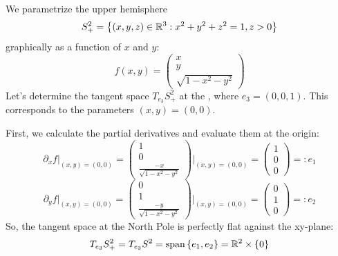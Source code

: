\begin{example*}
We parametrize the upper hemisphere
\[ S_+^2 = \left\{ (x,y,z) \in \mathbb{R}^3 : x^2 + y^2 + z^2 = 1, z > 0 \right\} \]
graphically as a function of $x$ and $y$:
\[ f(x,y) = \begin{pmatrix} x \\ y \\ \sqrt{1 - x^2 - y^2} \end{pmatrix} \]
Let's determine the tangent space $T_{e_3} S_+^2$ at the , where $e_3 = (0,0,1)$. This corresponds to the parameters $(x,y) = (0,0)$.

First, we calculate the partial derivatives and evaluate them at the origin:
\[ \partial_x f \Big|_{(x,y)=(0,0)} = \begin{pmatrix} 1 \\ 0 \\ \frac{-x}{\sqrt{1 - x^2 - y^2}} \end{pmatrix} \Bigg|_{(x,y)=(0,0)} = \begin{pmatrix} 1 \\ 0 \\ 0 \end{pmatrix} =: e_1 \]
\[ \partial_y f \Big|_{(x,y)=(0,0)} = \begin{pmatrix} 0 \\ 1 \\ \frac{-y}{\sqrt{1 - x^2 - y^2}} \end{pmatrix} \Bigg|_{(x,y)=(0,0)} = \begin{pmatrix} 0 \\ 1 \\ 0 \end{pmatrix} =: e_2 \]
So, the tangent space at the North Pole is perfectly flat against the xy-plane:
\[ T_{e_3} S_+^2 = T_{e_3} S^2 = \operatorname{span}\left\{ e_1, e_2 \right\} = \mathbb{R}^2 \times \left\{ 0 \right\} \]

\begin{center}
\end{center}
\end{example*}

